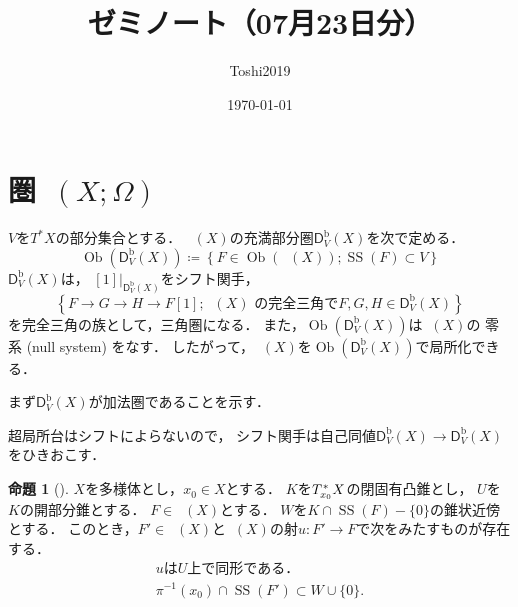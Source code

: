 \documentclass[leqno, 10pt, a4paper, dvipdfmx]{jsarticle}
\title{ゼミノート（07月23日分）}
\author{Toshi2019}
\date{\today}
\makeatletter
\theoremstyle{definition}
\renewenvironment{proof}[1][\proofname]{\par
  \pushQED{\qed}%
  \normalfont \topsep6\p@\@plus6\p@\relax
  \trivlist
  \item[\hskip\labelsep
         \bfseries
    {#1}]\ignorespaces
}{%
  \popQED\endtrivlist\@endpefalse
}
\renewcommand{\proofname}{証明.}
\numberwithin{equation}{section}
\newcommand{\Ob}{\mathop{\textrm{Ob}}\nolimits}
\newcommand{\Dompb}{\mathop{\mathsf{D}^\mathrm{b}}\nolimits}
\newcommand{\muS}{\mathop{\mathrm{SS}}\nolimits}
\newcommand{\mres}[2][]{{\left.{#1}\right\rvert}_{#2}}
\theoremstyle{mystyle}
\newtheorem{PRP}[AXM]{命題}
\renewenvironment{leftbar}{%
  \def\FrameCommand{\textcolor{lightgray}{\vrule width 4pt} \hspace{10pt}}%
  \MakeFramed {\advance\hsize-\width \FrameRestore}}%
{\endMakeFramed}
\newcommand{\cotb}[1][]{T^{\ast}{#1}}
\newcommand{\conm}[2][]{T_{#1}^{\hspace{0.7pt}\ast}{#2}}
\newcommand{\mucat}[2][]{\mathsf{D}^{\mathrm{b}}_{#1}(#2)}
\makeatother
\begin{document}
\maketitle
\tableofcontents
\section{圏\(\Dompb(X;\varOmega)\)}

\(V\)を\(\cotb[X]\)の部分集合とする．
\(\Dompb(X)\)の充満部分圏\(\mucat[V]{X}\)を次で定める．
\begin{equation}\label{eq:6.1.1}
    \Ob(\mucat[V]{X})\coloneqq
    \left\{F\in\Ob(\Dompb(X));\muS(F)\subset V\right\}
\end{equation}
\(\mucat[V]{X}\)は，
\(\mres[{[1]}]{\mucat[V]{X}}\)をシフト関手，
\[
    \left\{F\to G\to H\to F[1]\mathrel{;}\text{\(\Dompb(X)\) の完全三角で} F,G,H\in\mucat[V]{X}\right\}
\]
を完全三角の族として，三角圏になる．
また，\(\Ob(\mucat[V]{X})\)は\(\Dompb(X)\)の
零系 (null system) をなす．
したがって，\(\Dompb(X)\)を\(\Ob(\mucat[V]{X})\)で局所化できる．

\begin{proof}[{\(\mucat[V]{X}\)が三角圏になることの証明．}]
    まず\(\mucat[V]{X}\)が加法圏であることを示す．

    超局所台はシフトによらないので，
    シフト関手は自己同値\(\mucat[V]{X}\to\mucat[V]{X}\)をひきおこす．
\end{proof}


\clearpage
\begin{leftbar}
\begin{PRP}[{\cite[Prop.6.1.4]{KS90}}]\label{prp.6.1.4}
    \(X\)を多様体とし，\(x_0\in X\)とする．
    \(K\)を\(\conm[x_0]{X}\)の閉固有凸錐とし，
    \(U\)を\(K\)の開部分錐とする．
    \(F\in\Dompb(X)\)とする．
    \(W\)を\(K\cap\muS(F)-\{0\}\)の錐状近傍とする．
    このとき，\(F'\in\Dompb(X)\)と\(\Dompb(X)\)の射\(
        u\colon F'\to F
    \)で次をみたすものが存在する．
    \begin{align}
        \tag{6.1.7}\label{eq:6.1.7}
        \text{\(u\)は\(U\)上で同形である．}\\
        \tag{6.1.8}\label{eq:6.1.8}
        \pi^{-1}(x_0)\cap\muS(F')\subset W\cup\{0\}.
    \end{align}
\end{PRP}
\end{leftbar}
\end{document}
